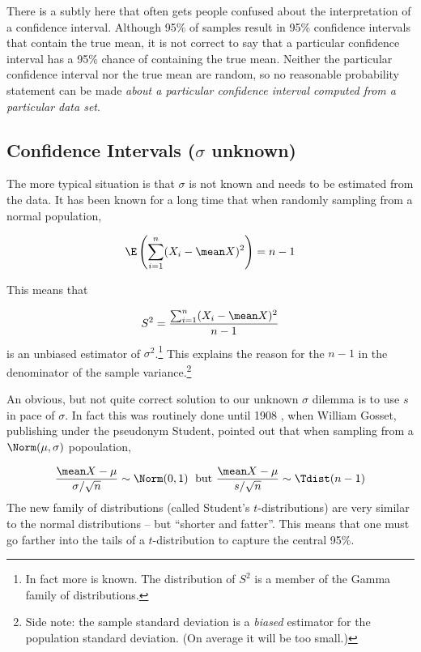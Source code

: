\documentclass[twoside]{book}\usepackage[]{graphicx}\usepackage[]{xcolor}
\begin{document}
There is a subtly here that often gets people confused about the interpretation
of a confidence interval.  Although 95\% of samples result in 95\% confidence
intervals that contain the true mean, it is not correct to say that a particular 
confidence interval has a 95\% chance of containing the true mean.  Neither the 
particular confidence interval nor the true mean are random, so no reasonable
probability statement can be made \emph{about a particular confidence interval
computed from a particular data set}.

\subsection{Confidence Intervals ($\sigma$ unknown)}

The more typical situation is that $\sigma$ is not known and needs to be estimated 
from the data.  It has been known for a long time that when randomly sampling 
from a normal population,

\[
\E\left( \sum_{i=1}^n (X_i - \mean X)^2 \right) = n-1
\]

This means that 

\[
S^2 = \frac{ \sum_{i=1}^n (X_i - \mean X)^2 }{n-1}
\]
is an unbiased estimator of $\sigma^2$.\footnote{In fact more is known.  The
distribution of $S^2$ is a member of the Gamma family of distributions.} This
explains the reason for the $n-1$ in the denominator of the sample
variance.\footnote{Side note: the sample standard deviation is a \emph{biased}
estimator for the population standard deviation.  (On average it will be too
small.)}

An obvious, but not quite correct solution to our unknown $\sigma$ dilemma is to use
$s$ in pace of $\sigma$.  In fact this was routinely done until 1908 
\cite{Student1908}, 
when William Gosset, publishing under the pseudonym Student, pointed out that 
when sampling from a $\Norm(\mu, \sigma)$ popoulation,

\[
\frac{ \mean X - \mu}{\sigma/\sqrt{n}} \sim \Norm(0,1)
\mbox{\;\ but\ } 
\frac{ \mean X - \mu}{s/\sqrt{n}} \sim \Tdist(n-1)
\]
The new family of distributions (called Student's $t$-distributions) are very 
similar to the normal distributions -- but ``shorter and fatter''.  This means that
one must go farther into the tails of a $t$-distribution to capture the central 95\%.
\end{document}
